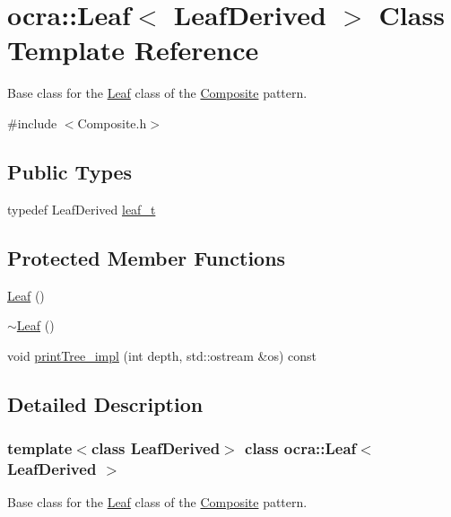 \hypertarget{classocra_1_1Leaf}{}\section{ocra\+:\+:Leaf$<$ Leaf\+Derived $>$ Class Template Reference}
\label{classocra_1_1Leaf}


Base class for the \hyperlink{classocra_1_1Leaf}{Leaf} class of the \hyperlink{classocra_1_1Composite}{Composite} pattern.  




{\ttfamily \#include $<$Composite.\+h$>$}

\subsection*{Public Types}
\begin{DoxyCompactItemize}
\item 
typedef Leaf\+Derived \hyperlink{classocra_1_1Leaf_ab2cc1a54ddf2da28942fa60c8da165f1}{leaf\+\_\+t}
\end{DoxyCompactItemize}
\subsection*{Protected Member Functions}
\begin{DoxyCompactItemize}
\item 
\hyperlink{classocra_1_1Leaf_a8c1c832842c03c2a0c24c2129ddbdc8a}{Leaf} ()
\item 
\hyperlink{classocra_1_1Leaf_a192f19a657e776a381da384279417f01}{$\sim$\+Leaf} ()
\item 
void \hyperlink{classocra_1_1Leaf_aaf46f5b8cd9d9667b8080898b1d9138a}{print\+Tree\+\_\+impl} (int depth, std\+::ostream \&os) const
\end{DoxyCompactItemize}


\subsection{Detailed Description}
\subsubsection*{template$<$class Leaf\+Derived$>$\newline
class ocra\+::\+Leaf$<$ Leaf\+Derived $>$}

Base class for the \hyperlink{classocra_1_1Leaf}{Leaf} class of the \hyperlink{classocra_1_1Composite}{Composite} pattern. 

